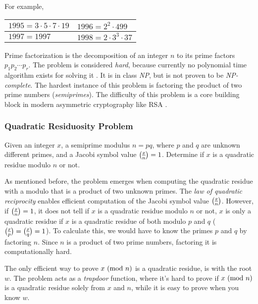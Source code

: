 For example,

\begin{center}
	\begin{tabular}{|l|l|}
		\hline
		$1995 = 3 \cdot 5 \cdot 7 \cdot 19$ & 
		$1996 = 2^2 \cdot 499$ \\
		\hline
		$1997 = 1997$ &
		$1998 = 2 \cdot 3^3 \cdot 37$\\
		\hline
	\end{tabular}
\end{center}


Prime factorization is the decomposition of an integer $n$ to its prime factors $p_1 p_2 \cdots p_r$.
The problem is considered \textit{hard}, because currently no polynomial time algorithm exists for solving it \cite{Buchmann2001}. It is in class \textit{NP}, but is not proven to be \textit{NP-complete}.
The hardest instance of this problem is factoring the product of two prime numbers (\textit{semiprimes}).
The difficulty of this problem is a core building block in modern asymmetric cryptography like RSA \cite{rivest1978method}.

\subsubsection{Quadratic Residuosity Problem}

\begin{remark}
	Given an integer $x$, a semiprime modulus $n = pq$, where $p$ and $q$ are unknown different primes, and a Jacobi symbol value $\legendre{x}{n} = 1$.
Determine if $x$ is a quadratic residue modulo $n$ or not.
\end{remark}

As mentioned before, the problem emerges when computing the quadratic residue with a modulo that is a product of two unknown primes.
The \textit{law of quadratic reciprocity} enables efficient computation of the Jacobi symbol value $\legendre{x}{n}$.
However, if $\legendre{x}{n} = 1$, it does not tell if $x$ is a quadratic residue modulo $n$ or not, $x$ is only a quadratic residue if $x$ is a quadratic residue of both modulo $p$ and $q$ ($\legendre{x}{p} = \legendre{x}{q} = 1$).
To calculate this, we would have to know the primes $p$ and $q$ by factoring $n$.
Since $n$ is a product of two prime numbers, factoring it is computationally hard.

The only efficient way to prove $x \ (\mathrm{mod}\ n)$ is a quadratic residue, is with the root $w$.
The problem acts as a \textit{trapdoor} function, where it's hard to prove if $x \ (\mathrm{mod}\ n)$ is a quadratic residue solely from $x$ and $n$, while it is easy to prove when you know $w$.

